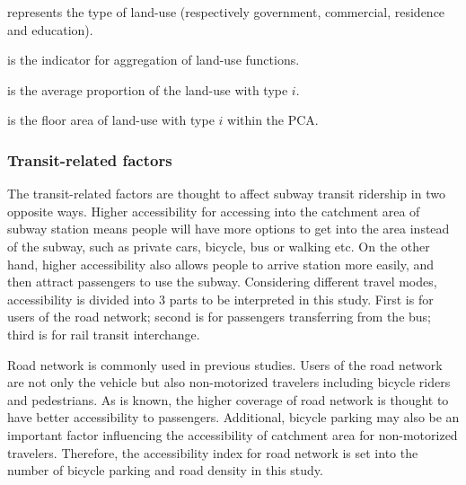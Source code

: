 \begin{description}
	\setlength{\parskip}{0\baselineskip} %
	\normalsize
	\item[\textbf{Where:}]
	\item[$i$] represents the type of land-use (respectively government, commercial, residence and education).
	\item[$A$] is the indicator for aggregation of land-use functions.
	\item[$P_i$] is the average proportion of the land-use with type $i$.
	\item[$L_i$] is the floor area of land-use with type $i$ within the PCA.
	\setlength{\parskip}{0.7\baselineskip} %
\end{description}

\subsubsection{Transit-related factors}
%
The transit-related factors are thought to affect subway transit ridership in two opposite ways. Higher accessibility for accessing into the catchment area of subway station means people will have more options to get into the area instead of the subway, such as private cars, bicycle, bus or walking etc. On the other hand, higher accessibility also allows people to arrive station more easily, and then attract passengers to use the subway. Considering different travel modes, accessibility is divided into 3 parts to be interpreted in this study. First is for users of the road network; second is for passengers transferring from the bus; third is for rail transit interchange.

%
Road network is commonly used in previous studies. Users of the road network are not only the vehicle but also non-motorized travelers including bicycle riders and pedestrians. As is known, the higher coverage of road network is thought to have better accessibility to passengers. Additional, bicycle parking may also be an important factor influencing the accessibility of catchment area for non-motorized travelers. Therefore, the accessibility index for road network is set into the number of bicycle parking and road density in this study.

